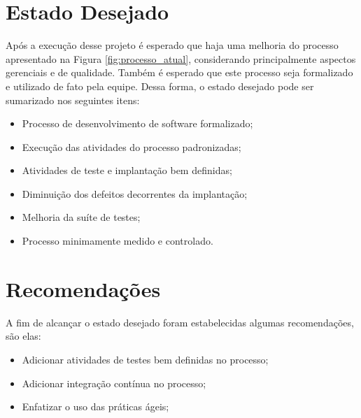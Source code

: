 \section{Estado Desejado}

Após a execução desse projeto é esperado que haja uma melhoria do processo apresentado na Figura \ref{fig:processo_atual}, 
considerando principalmente aspectos gerenciais e de qualidade. Também é esperado que este processo seja formalizado e utilizado
de fato pela equipe. Dessa forma, o estado desejado pode ser sumarizado nos seguintes itens:

\begin{itemize}
	\item Processo de desenvolvimento de software formalizado;
	\item Execução das atividades do processo padronizadas;
	\item Atividades de teste e implantação bem definidas;
	\item Diminuição dos defeitos decorrentes da implantação;
	\item Melhoria da suíte de testes;
	\item Processo minimamente medido e controlado.

\end{itemize}

	
\section{Recomendações}

A fim de alcançar o estado desejado foram estabelecidas algumas recomendações, são elas: 

\begin{itemize}
    \item Adicionar atividades de testes bem definidas no processo;
    \item Adicionar integração contínua no processo;
    \item Enfatizar o uso das práticas ágeis;
\end{itemize}
